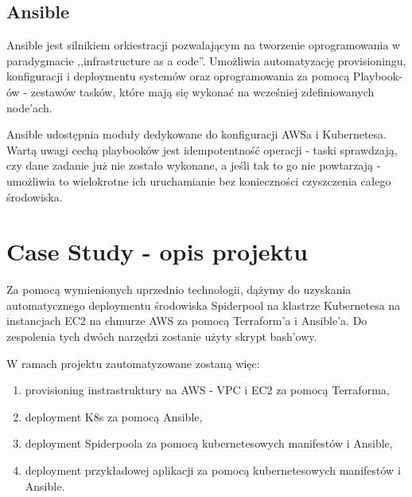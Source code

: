 \documentclass[onecolumn,12pt]{article}
\begin{document}
\subsection{Ansible}
Ansible jest silnikiem orkiestracji pozwalającym na tworzenie oprogramowania w paradygmacie ,,infrastructure as a code''.
Umożliwia automatyzację provisioningu, konfiguracji i deploymentu systemów oraz oprogramowania za pomocą Playbook-ów - zestawów tasków, które mają się wykonać na wcześniej zdefiniowanych node'ach.

Ansible udostępnia moduły dedykowane do konfiguracji AWSa i Kubernetesa.
Wartą uwagi cechą playbooków jest idempotentność operacji - taski sprawdzają, czy dane zadanie już nie zostało wykonane, a jeśli tak to go nie powtarzają - umożliwia to wielokrotne ich uruchamianie bez konieczności czyszczenia całego środowiska.

\section{Case Study - opis projektu}
Za pomocą wymienionych uprzednio technologii, dążymy do uzyskania automatycznego deploymentu środowiska Spiderpool na klastrze Kubernetesa na instancjach EC2 na chmurze AWS za pomocą Terraform'a i Ansible'a.
Do zespolenia tych dwóch narzędzi zostanie użyty skrypt bash'owy.

W ramach projektu zautomatyzowane zostaną więc:
\begin{enumerate}
    \item provisioning instrastruktury na AWS - VPC i EC2 za pomocą Terraforma,
    \item deployment K8s za pomocą Ansible,
    \item deployment Spiderpoola za pomocą kubernetesowych manifestów i Ansible,
    \item deployment przykładowej aplikacji za pomocą kubernetesowych manifestów i Ansible.
\end{enumerate}
\end{document}

